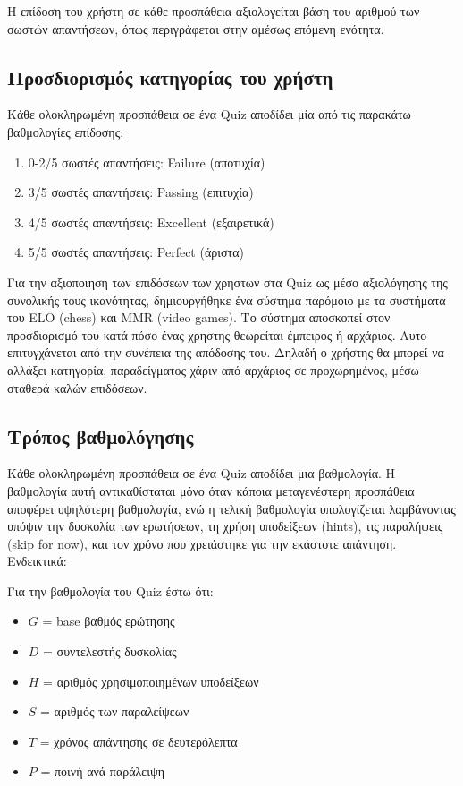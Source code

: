\documentclass{article}
\begin{document}
Η επίδοση του χρήστη σε κάθε προσπάθεια αξιολογείται βάση του αριθμού των σωστών απαντήσεων, όπως περιγράφεται στην αμέσως επόμενη ενότητα.

\subsection{Προσδιορισμός κατηγορίας του χρήστη}
Κάθε ολοκληρωμένη προσπάθεια σε ένα \foreignlanguage{english}{Quiz} αποδίδει μία από τις παρακάτω βαθμολογίες επίδοσης:
\begin{enumerate}
    \item 0-2/5 σωστές απαντήσεις: \foreignlanguage{english}{Failure} (αποτυχία)
    \item 3/5 σωστές απαντήσεις: \foreignlanguage{english}{Passing} (επιτυχία)
    \item 4/5 σωστές απαντήσεις: \foreignlanguage{english}{Excellent} (εξαιρετικά)
    \item 5/5 σωστές απαντήσεις: \foreignlanguage{english}{Perfect} (άριστα)
\end{enumerate}

Για την αξιοποιηση των επιδόσεων των χρηστων στα \foreignlanguage{english}{Quiz} ως μέσο αξιολόγησης της συνολικής τους ικανότητας, δημιουργήθηκε ένα σύστημα παρόμοιο με τα συστήματα του \foreignlanguage{english}{ELO (chess)} και \foreignlanguage{english}{MMR (video games)}. Το σύστημα αποσκοπεί στον προσδιορισμό του κατά πόσο ένας χρηστης θεωρείται έμπειρος ή αρχάριος. Αυτο επιτυγχάνεται από την συνέπεια της απόδοσης του. Δηλαδή ο χρήστης θα μπορεί να αλλάξει κατηγορία, παραδείγματος χάριν από αρχάριος σε προχωρημένος, μέσω σταθερά καλών επιδόσεων.

\subsection{Τρόπος βαθμολόγησης}
Κάθε ολοκληρωμένη προσπάθεια σε ένα \foreignlanguage{english}{Quiz} αποδίδει μια βαθμολογία. Η βαθμολογία αυτή αντικαθίσταται μόνο όταν κάποια μεταγενέστερη προσπάθεια αποφέρει υψηλότερη βαθμολογία, ενώ η τελική βαθμολογία υπολογίζεται λαμβάνοντας υπόψιν την δυσκολία των ερωτήσεων, τη χρήση υποδείξεων \foreignlanguage{english}{(hints)}, τις παραλήψεις \foreignlanguage{english}{(skip for now)}, και τον χρόνο που χρειάστηκε για την εκάστοτε απάντηση. Ενδεικτικά:

Για την βαθμολογία του \foreignlanguage{english}{Quiz} έστω ότι:

\begin{itemize}
    \item $G$ = \foreignlanguage{english}{base} βαθμός ερώτησης
    \item $D$ = συντελεστής δυσκολίας
    \item $H$ = αριθμός χρησιμοποιημένων υποδείξεων
    \item $S$ = αριθμός των παραλείψεων
    \item $T$ = χρόνος απάντησης σε δευτερόλεπτα
    \item  $P$ = ποινή ανά παράλειψη
\end{itemize}
\end{document}
